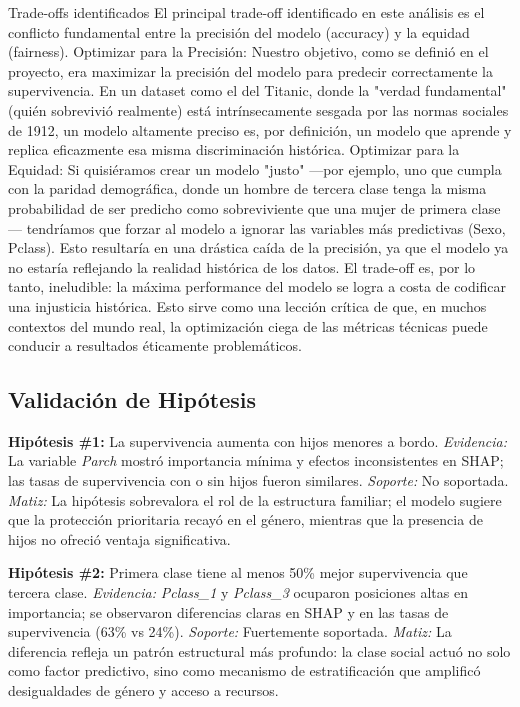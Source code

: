\documentclass[conference]{IEEEtran}
\begin{document}
Trade-offs identificados
El principal trade-off identificado en este análisis es el conflicto fundamental entre la precisión del modelo (accuracy) y la equidad (fairness).
Optimizar para la Precisión: Nuestro objetivo, como se definió en el proyecto, era maximizar la precisión del modelo para predecir correctamente la supervivencia. En un dataset como el del Titanic, donde la "verdad fundamental" (quién sobrevivió realmente) está intrínsecamente sesgada por las normas sociales de 1912, un modelo altamente preciso es, por definición, un modelo que aprende y replica eficazmente esa misma discriminación histórica.
Optimizar para la Equidad: Si quisiéramos crear un modelo "justo" —por ejemplo, uno que cumpla con la paridad demográfica, donde un hombre de tercera clase tenga la misma probabilidad de ser predicho como sobreviviente que una mujer de primera clase— tendríamos que forzar al modelo a ignorar las variables más predictivas (Sexo, Pclass). Esto resultaría en una drástica caída de la precisión, ya que el modelo ya no estaría reflejando la realidad histórica de los datos.
El trade-off es, por lo tanto, ineludible: la máxima performance del modelo se logra a costa de codificar una injusticia histórica. Esto sirve como una lección crítica de que, en muchos contextos del mundo real, la optimización ciega de las métricas técnicas puede conducir a resultados éticamente problemáticos.


\subsection{Validación de Hipótesis}

\textbf{Hipótesis \#1:} La supervivencia aumenta con hijos menores a bordo.  
\textit{Evidencia:} La variable \textit{Parch} mostró importancia mínima y efectos inconsistentes en SHAP; las tasas de supervivencia con o sin hijos fueron similares.  
\textit{Soporte:} No soportada.  
\textit{Matiz:} La hipótesis sobrevalora el rol de la estructura familiar; el modelo sugiere que la protección prioritaria recayó en el género, mientras que la presencia de hijos no ofreció ventaja significativa.  

\medskip

\textbf{Hipótesis \#2:} Primera clase tiene al menos 50\% mejor supervivencia que tercera clase.  
\textit{Evidencia:} \textit{Pclass\_1} y \textit{Pclass\_3} ocuparon posiciones altas en importancia; se observaron diferencias claras en SHAP y en las tasas de supervivencia (63\% vs 24\%).  
\textit{Soporte:} Fuertemente soportada.  
\textit{Matiz:} La diferencia refleja un patrón estructural más profundo: la clase social actuó no solo como factor predictivo, sino como mecanismo de estratificación que amplificó desigualdades de género y acceso a recursos.  
\end{document}
